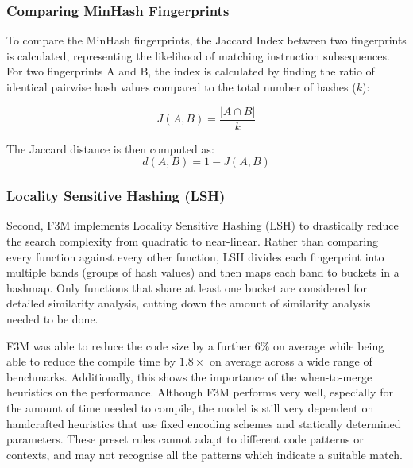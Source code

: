 \subsubsection{Comparing MinHash Fingerprints} \label{METRIC:MinHashDistance}
To compare the MinHash fingerprints, the Jaccard Index between two fingerprints is calculated, representing the likelihood of matching instruction subsequences. For two fingerprints A and B, the index is calculated by finding the ratio of identical pairwise hash values compared to the total number of hashes ($k$):

$$J(A, B) = \frac{|A\cap B|}{k}$$

The Jaccard distance is then computed as: 
$$d(A, B) = 1 - J(A, B)$$

\subsubsection{Locality Sensitive Hashing (LSH)}
Second, F3M implements Locality Sensitive Hashing (LSH) to drastically reduce the search complexity from quadratic to near-linear. Rather than comparing every function against every other function, LSH divides each fingerprint into multiple bands (groups of hash values) and then maps each band to buckets in a hashmap. Only functions that share at least one bucket are considered for detailed similarity analysis, cutting down the amount of similarity analysis needed to be done.




F3M was able to reduce the code size by a further $6\%$ on average while being able to reduce the compile time by $1.8\times$ on average across a wide range of benchmarks. Additionally, this shows the importance of the when-to-merge heuristics on the performance. Although F3M performs very well, especially for the amount of time needed to compile, the model is still very dependent on handcrafted heuristics that use fixed encoding schemes and statically determined parameters. These preset rules cannot adapt to different code patterns or contexts, and may not recognise all the patterns which indicate a suitable match.




